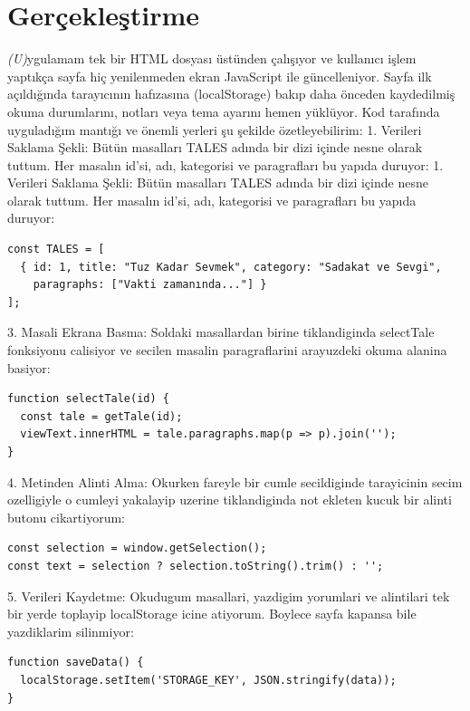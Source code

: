 \documentclass[12pt,a4paper]{article}
\newcommand{\aciklama}[1]{{\color{gray}\itshape (#1)}}
\begin{document}
\section{Gerçekleştirme}
\aciklama 
Uygulamam tek bir HTML dosyası üstünden çalışıyor ve kullanıcı işlem yaptıkça sayfa hiç yenilenmeden ekran JavaScript ile güncelleniyor. Sayfa ilk açıldığında tarayıcının hafızasına (localStorage) bakıp daha önceden kaydedilmiş okuma durumlarını, notları veya tema ayarını hemen yüklüyor.
Kod tarafında uyguladığım mantığı ve önemli yerleri şu şekilde özetleyebilirim:
1. Verileri Saklama Şekli: Bütün masalları TALES adında bir dizi içinde nesne olarak tuttum. Her masalın id’si, adı, kategorisi ve paragrafları bu yapıda duruyor:
1. Verileri Saklama Şekli: Bütün masalları TALES adında bir dizi içinde nesne olarak tuttum. Her masalın id'si, adı, kategorisi ve paragrafları bu yapıda duruyor:
\begin{verbatim}
const TALES = [
  { id: 1, title: "Tuz Kadar Sevmek", category: "Sadakat ve Sevgi",
    paragraphs: ["Vakti zamanında..."] }
];
\end{verbatim}

3. Masali Ekrana Basma: Soldaki masallardan birine tiklandiginda selectTale fonksiyonu calisiyor ve secilen masalin paragraflarini arayuzdeki okuma alanina basiyor:
\begin{verbatim}
function selectTale(id) {
  const tale = getTale(id);
  viewText.innerHTML = tale.paragraphs.map(p => p).join('');
}
\end{verbatim}

4. Metinden Alinti Alma: Okurken fareyle bir cumle secildiginde tarayicinin secim ozelligiyle o cumleyi yakalayip uzerine tiklandiginda not ekleten kucuk bir alinti butonu cikartiyorum:
\begin{verbatim}
const selection = window.getSelection();
const text = selection ? selection.toString().trim() : '';
\end{verbatim}

5. Verileri Kaydetme: Okudugum masallari, yazdigim yorumlari ve alintilari tek bir yerde toplayip localStorage icine atiyorum. Boylece sayfa kapansa bile yazdiklarim silinmiyor:
\begin{verbatim}
function saveData() {
  localStorage.setItem('STORAGE_KEY', JSON.stringify(data));
}
\end{verbatim}
\end{document}
